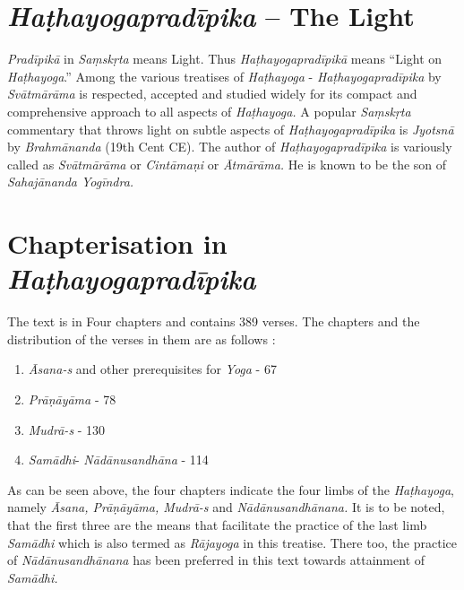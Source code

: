 \section*{\textit{Haṭhayogapradīpika} – The Light }
\textit{Pradīpikā} in \textit{Saṃskṛta} means Light. Thus \textit{Haṭhayogapradīpikā} means “Light on \textit{Haṭhayoga}.” Among the various treatises of \textit{Haṭhayoga} - \textit{Haṭhayogapradīpika} by \textit{Svātmārāma} is respected, accepted and studied widely for its compact and comprehensive approach to all aspects of \textit{Haṭhayoga.} A popular \textit{Saṃskṛta} commentary that throws light on subtle aspects of \textit{Haṭhayogapradīpika} is  \textit{Jyotsnā} by \textit{Brahmānanda} (19th Cent CE).  The author of \textit{Haṭhayogapradīpika} is variously called as \textit{Svātmārāma} or \textit{Cintāmaṇi} or \textit{Ātmārāma.} He is known to be the son of \textit{Sahajānanda Yogīndra.}

\section*{Chapterisation in \textit{Haṭhayogapradīpika}}

The text is in Four chapters and contains 389 verses. The chapters and the distribution of the verses in them are as follows :  

\begin{enumerate}
\itemsep=0pt
\renewcommand{\theenumi}{\Roman{enumi}}
\renewcommand{\labelenumi}{\theenumi.}
\item \textit{Āsana-s} and other prerequisites for \textit{Yoga} - 67
\item \textit{Prāṇāyāma} - 78
\item \textit{Mudrā-s}  - 130
\item \textit{Samādhi}- \textit{Nādānusandhāna} - 114
\end{enumerate}

As can be seen above, the four chapters indicate the four limbs of the \textit{Haṭhayoga}, namely \textit{Āsana, Prāṇāyāma, Mudrā-s} and \textit{Nādānusandhānana.} It is to be noted, that the first three are the means that facilitate the practice of the last limb \textit{Samādhi} which is also termed as \textit{Rājayoga} in this treatise. There too, the practice of \textit{Nādānusandhānana} has been preferred in this text towards attainment of \textit{Samādhi.} 
